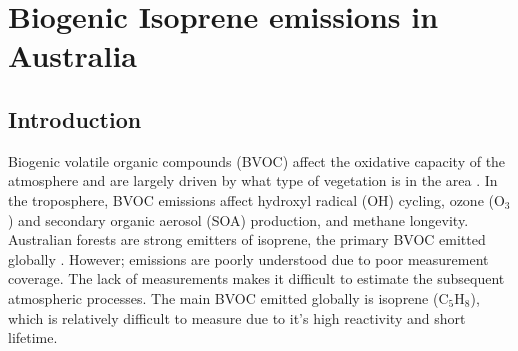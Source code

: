 
%
%



\chapter{Biogenic Isoprene emissions in Australia} %
\label{BioIsop}
  
\section{Introduction}  
\label{BioIsop:intro}  
  
  
  
  Biogenic volatile organic compounds (BVOC) affect the oxidative capacity of the atmosphere and are largely driven by what type of vegetation is in the area \parencite{Kefauver2014}.
  In the troposphere, BVOC emissions affect hydroxyl radical (OH) cycling, ozone (O$_3$) and secondary organic aerosol (SOA) production, and methane longevity.
  Australian forests are strong emitters of isoprene, the primary BVOC emitted globally \parencite{Guenther2006,Messina2016}. %
  However; emissions are poorly understood due to poor measurement coverage.
  The lack of measurements makes it difficult to estimate the subsequent atmospheric processes. 
  The main BVOC emitted globally is isoprene (C$_5$H$_8$), which is relatively difficult to measure due to it's high reactivity and short lifetime.
  
